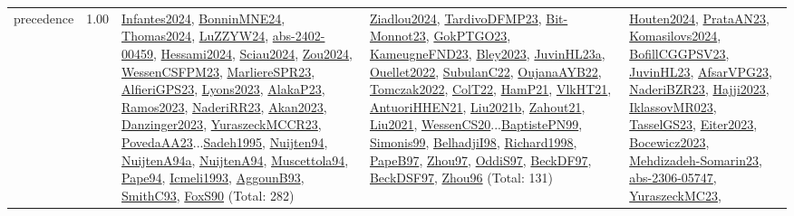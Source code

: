 {\begin{longtable}{p{3cm}r>{\raggedright\arraybackslash}p{6cm}>{\raggedright\arraybackslash}p{6cm}>{\raggedright\arraybackslash}p{8cm}}
\index{precedence}\index{Concepts!precedence}precedence &  1.00 & \hyperref[detail:Infantes2024]{Infantes2024}, \hyperref[detail:BonninMNE24]{BonninMNE24}, \hyperref[detail:Thomas2024]{Thomas2024}, \hyperref[detail:LuZZYW24]{LuZZYW24}, \hyperref[detail:abs-2402-00459]{abs-2402-00459}, \hyperref[detail:Hessami2024]{Hessami2024}, \hyperref[detail:Sciau2024]{Sciau2024}, \hyperref[detail:Zou2024]{Zou2024}, \hyperref[detail:WessenCSFPM23]{WessenCSFPM23}, \hyperref[detail:MarliereSPR23]{MarliereSPR23}, \hyperref[detail:AlfieriGPS23]{AlfieriGPS23}, \hyperref[detail:Lyons2023]{Lyons2023}, \hyperref[detail:AlakaP23]{AlakaP23}, \hyperref[detail:Ramos2023]{Ramos2023}, \hyperref[detail:NaderiRR23]{NaderiRR23}, \hyperref[detail:Akan2023]{Akan2023}, \hyperref[detail:Danzinger2023]{Danzinger2023}, \hyperref[detail:YuraszeckMCCR23]{YuraszeckMCCR23}, \hyperref[detail:PovedaAA23]{PovedaAA23}...\hyperref[detail:Sadeh1995]{Sadeh1995}, \hyperref[detail:Nuijten94]{Nuijten94}, \hyperref[detail:NuijtenA94a]{NuijtenA94a}, \hyperref[detail:NuijtenA94]{NuijtenA94}, \hyperref[detail:Muscettola94]{Muscettola94}, \hyperref[detail:Pape94]{Pape94}, \hyperref[detail:Icmeli1993]{Icmeli1993}, \hyperref[detail:AggounB93]{AggounB93}, \hyperref[detail:SmithC93]{SmithC93}, \hyperref[detail:FoxS90]{FoxS90} (Total: 282) & \hyperref[detail:Ziadlou2024]{Ziadlou2024}, \hyperref[detail:TardivoDFMP23]{TardivoDFMP23}, \hyperref[detail:Bit-Monnot23]{Bit-Monnot23}, \hyperref[detail:GokPTGO23]{GokPTGO23}, \hyperref[detail:KameugneFND23]{KameugneFND23}, \hyperref[detail:Bley2023]{Bley2023}, \hyperref[detail:JuvinHL23a]{JuvinHL23a}, \hyperref[detail:Ouellet2022]{Ouellet2022}, \hyperref[detail:SubulanC22]{SubulanC22}, \hyperref[detail:OujanaAYB22]{OujanaAYB22}, \hyperref[detail:Tomczak2022]{Tomczak2022}, \hyperref[detail:ColT22]{ColT22}, \hyperref[detail:HamP21]{HamP21}, \hyperref[detail:VlkHT21]{VlkHT21}, \hyperref[detail:AntuoriHHEN21]{AntuoriHHEN21}, \hyperref[detail:Liu2021b]{Liu2021b}, \hyperref[detail:Zahout21]{Zahout21}, \hyperref[detail:Liu2021]{Liu2021}, \hyperref[detail:WessenCS20]{WessenCS20}...\hyperref[detail:BaptistePN99]{BaptistePN99}, \hyperref[detail:Simonis99]{Simonis99}, \hyperref[detail:BelhadjiI98]{BelhadjiI98}, \hyperref[detail:Richard1998]{Richard1998}, \hyperref[detail:PapeB97]{PapeB97}, \hyperref[detail:Zhou97]{Zhou97}, \hyperref[detail:OddiS97]{OddiS97}, \hyperref[detail:BeckDF97]{BeckDF97}, \hyperref[detail:BeckDSF97]{BeckDSF97}, \hyperref[detail:Zhou96]{Zhou96} (Total: 131) & \hyperref[detail:Houten2024]{Houten2024}, \hyperref[detail:PrataAN23]{PrataAN23}, \hyperref[detail:Komasilovs2024]{Komasilovs2024}, \hyperref[detail:BofillCGGPSV23]{BofillCGGPSV23}, \hyperref[detail:JuvinHL23]{JuvinHL23}, \hyperref[detail:AfsarVPG23]{AfsarVPG23}, \hyperref[detail:NaderiBZR23]{NaderiBZR23}, \hyperref[detail:Hajji2023]{Hajji2023}, \hyperref[detail:IklassovMR023]{IklassovMR023}, \hyperref[detail:TasselGS23]{TasselGS23}, \hyperref[detail:Eiter2023]{Eiter2023}, \hyperref[detail:Bocewicz2023]{Bocewicz2023}, \hyperref[detail:Mehdizadeh-Somarin23]{Mehdizadeh-Somarin23}, \hyperref[detail:abs-2306-05747]{abs-2306-05747}, \hyperref[detail:YuraszeckMC23]{YuraszeckMC23}, 
\end{longtable}}
